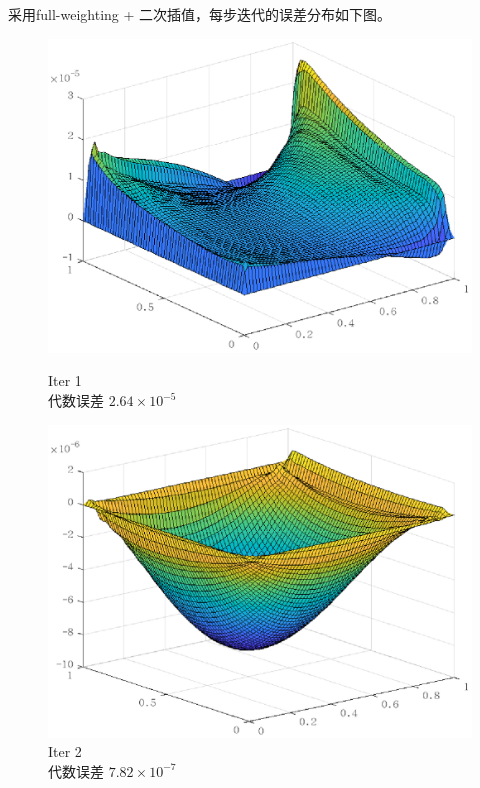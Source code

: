 \documentclass[lang=cn,10pt]{elegantbook}
\begin{document}
采用full-weighting + 二次插值，每步迭代的误差分布如下图。
\begin{figure}[H]
  \centering
  \begin{minipage}[t]{0.22\linewidth}
      \centering
      \includegraphics[width=0.84\linewidth]{figure/2-5-11.eps}
      \caption*{\small Iter 1 \\ 代数误差 $2.64\times 10^{-5}$}
  \end{minipage}
  \hspace{1em}
  \begin{minipage}[t]{0.22\linewidth}
    \centering
    \includegraphics[width=0.84\linewidth]{figure/2-5-12.eps}
    \caption*{\small Iter 2 \\ 代数误差 $7.82\times 10^{-7}$}
  \end{minipage}
  \hspace{1em}
  \begin{minipage}[t]{0.22\linewidth}
    \centering

\end{minipage}
\end{figure}
\end{document}
